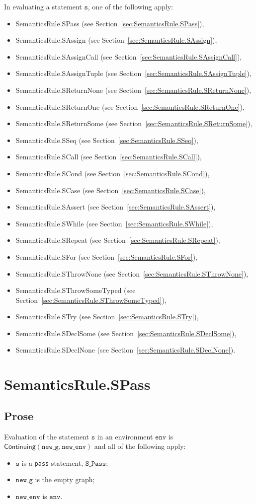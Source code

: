 \documentclass{book}
\newcommand\secref[1]{Section~\ref{sec:#1}}
\newcommand\Continuing[0]{\textsf{Continuing}}
\newcommand\newenv[0]{\texttt{new\_env}}
\newcommand\env[0]{\texttt{env}}
\newcommand\newg[0]{\texttt{new\_g}}
\newcommand\vs[0]{\texttt{s}}
\begin{document}
In evaluating a statement $\vs$, one of the following apply:
\begin{itemize}
\item SemanticsRule.SPass (see \secref{SemanticsRule.SPass}),
\item SemanticsRule.SAssign (see \secref{SemanticsRule.SAssign}),
\item SemanticsRule.SAssignCall (see \secref{SemanticsRule.SAssignCall}),
\item SemanticsRule.SAssignTuple (see \secref{SemanticsRule.SAssignTuple}),
\item SemanticsRule.SReturnNone (see \secref{SemanticsRule.SReturnNone}),
\item SemanticsRule.SReturnOne (see \secref{SemanticsRule.SReturnOne}),
\item SemanticsRule.SReturnSome (see \secref{SemanticsRule.SReturnSome}),
\item SemanticsRule.SSeq (see \secref{SemanticsRule.SSeq}),
\item SemanticsRule.SCall (see \secref{SemanticsRule.SCall}),
\item SemanticsRule.SCond (see \secref{SemanticsRule.SCond}),
\item SemanticsRule.SCase (see \secref{SemanticsRule.SCase}),
\item SemanticsRule.SAssert (see \secref{SemanticsRule.SAssert}),
\item SemanticsRule.SWhile (see \secref{SemanticsRule.SWhile}),
\item SemanticsRule.SRepeat (see \secref{SemanticsRule.SRepeat}),
\item SemanticsRule.SFor (see \secref{SemanticsRule.SFor}),
\item SemanticsRule.SThrowNone (see \secref{SemanticsRule.SThrowNone}),
\item SemanticsRule.SThrowSomeTyped (see \secref{SemanticsRule.SThrowSomeTyped}),
\item SemanticsRule.STry (see \secref{SemanticsRule.STry}),
\item SemanticsRule.SDeclSome (see \secref{SemanticsRule.SDeclSome}),
\item SemanticsRule.SDeclNone (see \secref{SemanticsRule.SDeclNone}).
\end{itemize}

\section{SemanticsRule.SPass \label{sec:SemanticsRule.SPass}}
  \subsection{Prose}
  Evaluation of the statement $\vs$ in an environment $\env$ is \\
  $\Continuing(\newg, \newenv)$ and all of the following apply:
  \begin{itemize}
  \item $\vs$ is a \texttt{pass} statement, $\texttt{S\_Pass}$;
  \item $\newg$ is the empty graph;
  \item $\newenv$ is $\env$.
  \end{itemize}
\end{document}
